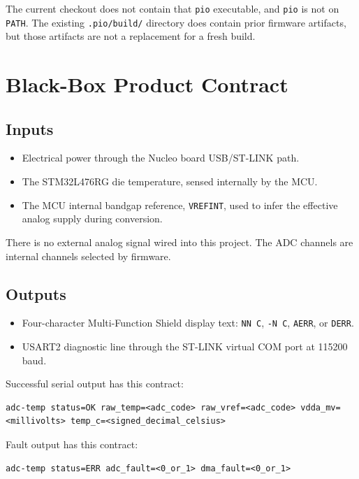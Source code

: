 \documentclass[11pt,a4paper]{article}
\begin{document}
The current checkout does not contain that \texttt{pio} executable, and
\texttt{pio} is not on \texttt{PATH}. The existing \texttt{.pio/build/}
directory does contain prior firmware artifacts, but those artifacts are not a
replacement for a fresh build.

\section{Black-Box Product Contract}

\subsection{Inputs}

\begin{itemize}[leftmargin=*]
  \item Electrical power through the Nucleo board USB/ST-LINK path.
  \item The STM32L476RG die temperature, sensed internally by the MCU.
  \item The MCU internal bandgap reference, \texttt{VREFINT}, used to infer the
        effective analog supply during conversion.
\end{itemize}

There is no external analog signal wired into this project. The ADC channels are
internal channels selected by firmware.

\subsection{Outputs}

\begin{itemize}[leftmargin=*]
  \item Four-character Multi-Function Shield display text:
        \texttt{NN C}, \texttt{-N C}, \texttt{AERR}, or \texttt{DERR}.
  \item USART2 diagnostic line through the ST-LINK virtual COM port at
        115200 baud.
\end{itemize}

Successful serial output has this contract:

\begin{lstlisting}
adc-temp status=OK raw_temp=<adc_code> raw_vref=<adc_code> vdda_mv=<millivolts> temp_c=<signed_decimal_celsius>
\end{lstlisting}

Fault output has this contract:

\begin{lstlisting}
adc-temp status=ERR adc_fault=<0_or_1> dma_fault=<0_or_1>
\end{lstlisting}
\end{document}
